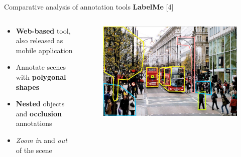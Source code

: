\documentclass{beamer}
\begin{document}
\begin{tframe}{Comparative analysis of annotation tools}
\textbf{LabelMe }[4]
\begin{columns}[t] %
\begin{column}{.5\textwidth}
\begin{itemize}
\item \textbf{Web-based} tool, also released as mobile application
\vspace{0.2cm}
\item Annotate scenes with \textbf{polygonal shapes}
\vspace{0.2cm}
\item \textbf{Nested} objects and \textbf{occlusion} annotations
\vspace{0.2cm}
\item \emph{Zoom in} and \emph{out} of the scene
\end{itemize}
\end{column}%
\begin{column}{.3\textwidth}
\begin{figure}[h]
\centering
\includegraphics[width=1\textwidth]{images/labelme.jpg}
\end{figure}
\end{column}%
\end{columns}
\end{tframe}
\end{document}
